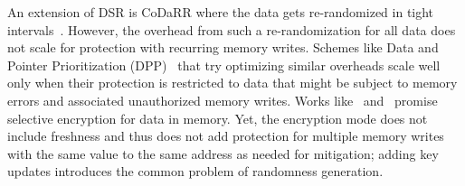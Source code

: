 An extension of DSR is CoDaRR where the data gets re-randomized in tight intervals~\cite{DBLP:conf/ccs/RajasekaranCGNV20}.
However, the overhead from such a re-randomization for all data does not scale for \ctsc{} protection with recurring memory writes.
Schemes like Data and Pointer Prioritization (DPP)~\cite{DBLP:conf/uss/0001LJHAY23} that try optimizing similar overheads scale well only when their protection is restricted to data that might be subject to memory errors and associated unauthorized memory writes.
Works like~\cite{DBLP:conf/acsac/PalitMP19} and~\cite{DBLP:conf/sp/PalitMMP21} promise selective encryption for data in memory.
Yet, the encryption mode does not include freshness and thus does not add protection for multiple memory writes with the same value to the same address as needed for \ctsc{} mitigation; adding key updates introduces the common problem of randomness generation.


